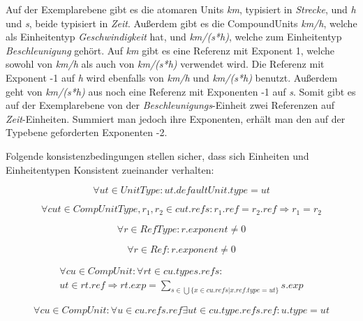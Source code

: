 Auf der Exemplarebene gibt es die atomaren Units \textit{km}, typisiert in \textit{Strecke}, und \textit{h} und \textit{s}, beide typisiert in \textit{Zeit}. Außerdem gibt es die CompoundUnits \textit{km/h}, welche als Einheitentyp \textit{Geschwindigkeit} hat, und \textit{km/(s*h)}, welche zum Einheitentyp \textit{Beschleunigung} gehört. Auf \textit{km} gibt es eine Referenz mit Exponent 1, welche sowohl von \textit{km/h} als auch von \textit{km/(s*h)} verwendet wird. Die Referenz mit Exponent -1 auf \textit{h} wird ebenfalls von \textit{km/h} und \textit{km/(s*h)} benutzt. Außerdem geht von \textit{km/(s*h)} aus noch eine Referenz mit Exponenten -1 auf \textit{s}. Somit gibt es auf der Exemplarebene von der \textit{Beschleunigungs}-Einheit zwei Referenzen auf \textit{Zeit}-Einheiten. Summiert man jedoch ihre Exponenten, erhält man den auf der Typebene geforderten Exponenten -2.


Folgende konsistenzbedingungen stellen sicher, dass sich Einheiten und Einheitentypen Konsistent zueinander verhalten:

\begin{equation} \forall ut \in UnitType : ut.defaultUnit.type = ut \end{equation}

\begin{equation} \forall cut \in CompUnitType, r_1, r_2 \in cut.refs : r_1.ref = r_2.ref \Rightarrow r_1 = r_2 \end{equation}

\begin{equation} \forall r \in RefType : r.exponent \ne 0 \end{equation}

\begin{equation} \forall r \in Ref : r.exponent \ne 0 \end{equation}

\begin{equation} 
\begin{split}
\forall cu \in CompUnit: \forall rt \in cu.types.refs:\\
ut \in rt.ref \Rightarrow rt.exp = \sum_{s \in \bigcup \{ x \in cu.refs | x.ref.type = ut \}} s.exp 
\end{split}
\end{equation}

 
\begin{equation} \forall cu \in CompUnit :
\forall u \in cu.refs.ref \exists ut \in cu.type.refs.ref : u.type = ut \end{equation}

